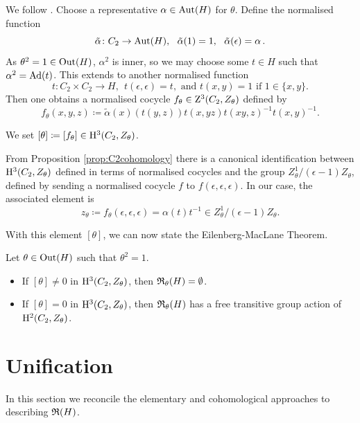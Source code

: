 We follow \cite[\S 7]{EML}. Choose a representative $\alpha \in \operatorname{Aut}(H)$ for $\theta$. Define the normalised function
\[ \tilde{\alpha} \colon C_2 \rightarrow \Aut(H), \ \ \tilde{\alpha}(1) = 1, \ \ \tilde{\alpha}(\epsilon) = \alpha \, .\]
As $\theta^2=1 \in \operatorname{Out}(H)$, $\alpha^2$ is inner, so we may choose some $t \in H$ such that $\alpha^2 = \operatorname{Ad}(t)$. This extends to another normalised function
\[ t: C_2 \times C_2 \rightarrow H, \ \ t(\epsilon, \epsilon) = t, \mbox{ and } t(x,y) = 1 \mbox{ if } 1\in \{x,y\}.\]
Then one obtains a normalised cocycle $f_\theta \in \mathrm{Z}^3 (C_2 , Z_{\theta})$ defined by
\[
    f_\theta(x,y,z) \coloneqq \tilde{\alpha}(x)(t(y,z))t(x,yz)t(xy,z)^{-1}t(x,y)^{-1}.
\]
\begin{defn}
We set $[\theta] \coloneqq [f_\theta]\in \mathrm{H}^3(C_2, Z_{\theta})$. 
\end{defn}
From Proposition \ref{prop:C2cohomology} there is a canonical identification between $\mathrm{H}^3(C_2, Z_{\theta})$ defined in terms of normalised cocycles and the group $Z_{\theta}^1 / (\epsilon - 1) Z_{\theta}$, defined by sending a normalised cocycle $f$ to $f(\epsilon, \epsilon, \epsilon)$. In our case, the associated element is 
\begin{equation}
z_\theta \coloneqq  f_\theta(\epsilon , \epsilon , \epsilon ) =  \alpha (t)t^{-1} \in Z_{\theta}^1 / (\epsilon - 1) Z_{\theta}.
\end{equation}

With this element $[\theta]$, we can now state the Eilenberg-MacLane Theorem.
\begin{thm}\label{thm:EMLv1}
    Let $\theta \in \operatorname{Out}(H)$ such that $\theta^2=1$.
    \begin{itemize}
        \item If $[\theta] \neq 0$ in $\mathrm{H}^3(C_2, Z_{\theta})$, then ${\mathfrak R}_{\theta}(H) = \emptyset$.
        \item If $[\theta] = 0$ in $\mathrm{H}^3(C_2, Z_{\theta})$, then ${\mathfrak R}_{\theta}(H)$ has a free transitive group action of $\mathrm{H}^2(C_2, Z_{\theta})$.
    \end{itemize}
\end{thm}

\section{Unification}\label{sect:unification} %
In this section we reconcile the elementary and cohomological approaches to describing ${\mathfrak R}(H)$.

